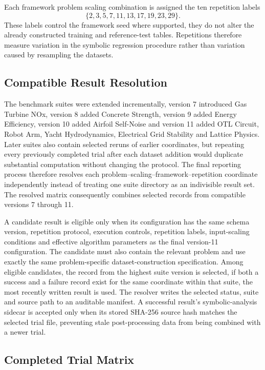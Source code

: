 \documentclass[12pt,oneside,bibtotoc,liststotoc]{scrbook}
\begin{document}
Each framework problem scaling combination is assigned the ten repetition labels
\begin{equation}
    \{2,3,5,7,11,13,17,19,23,29\}.
\end{equation}
These labels control the framework seed where supported, they do not alter the already constructed training and reference-test tables. Repetitions therefore measure variation in the symbolic regression procedure rather than variation caused by resampling the datasets.

\subsection{Compatible Result Resolution}

The benchmark suites were extended incrementally, version 7 introduced Gas Turbine NOx, version 8 added Concrete Strength, version 9 added Energy Efficiency, version 10 added Airfoil Self-Noise and version 11 added OTL Circuit, Robot Arm, Yacht Hydrodynamics, Electrical Grid Stability and Lattice Physics. Later suites also contain selected reruns of earlier coordinates, but repeating every previously completed trial after each dataset addition would duplicate substantial computation without changing the protocol. The final reporting process therefore resolves each problem--scaling--framework--repetition coordinate independently instead of treating one suite directory as an indivisible result set. The resolved matrix consequently combines selected records from compatible versions 7 through 11.

A candidate result is eligible only when its configuration has the same schema version, repetition protocol, execution controls, repetition labels, input-scaling conditions and effective algorithm parameters as the final version-11 configuration. The candidate must also contain the relevant problem and use exactly the same problem-specific dataset-construction specification. Among eligible candidates, the record from the highest suite version is selected, if both a success and a failure record exist for the same coordinate within that suite, the most recently written result is used. The resolver writes the selected status, suite and source path to an auditable manifest. A successful result's symbolic-analysis sidecar is accepted only when its stored SHA-256 source hash matches the selected trial file, preventing stale post-processing data from being combined with a newer trial.

\subsection{Completed Trial Matrix}
\end{document}
